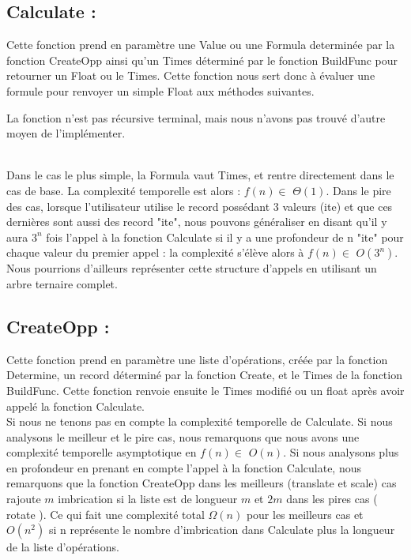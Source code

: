 \subsection{Calculate :}
Cette fonction prend en paramètre une Value ou une Formula determinée par la fonction CreateOpp ainsi qu'un Times déterminé par le fonction BuildFunc pour retourner un Float ou le Times. Cette fonction nous sert donc à évaluer une formule pour renvoyer un simple Float aux méthodes suivantes.

La fonction n'est pas récursive terminal, mais nous n'avons pas trouvé d'autre moyen de l'implémenter.

\\Dans le cas le plus simple, la Formula vaut Times, et rentre directement dans le cas de base.
La complexité temporelle est alors : $f(n) \in$  $\Theta(1)$. Dans le pire des cas, lorsque l'utilisateur utilise le record possédant 3 valeurs (ite) et que ces dernières sont aussi des record "ite", nous pouvons généraliser en disant qu'il y aura $3^n$ fois l'appel à la fonction Calculate si il y a une profondeur de n "ite" pour chaque valeur du premier appel : la complexité s'élève alors à $f(n) \in$  $O(3^n)$. Nous pourrions d'ailleurs représenter cette structure d'appels en utilisant un arbre ternaire complet.

\subsection{CreateOpp :}
Cette fonction prend en paramètre une liste d'opérations, créée par la fonction Determine, un record déterminé par la fonction Create, et le Times de la fonction BuildFunc. Cette fonction renvoie ensuite le Times modifié ou un float après avoir appelé la fonction Calculate.
\\Si nous ne tenons pas en compte la complexité temporelle de Calculate. Si nous analysons le meilleur et le pire cas, nous remarquons que nous avons une complexité temporelle asymptotique en $f(n) \in$ $O(n)$. Si nous analysons plus en profondeur en prenant en compte l'appel à la fonction Calculate, nous remarquons que la fonction CreateOpp dans les meilleurs (translate et scale) cas rajoute $m$ imbrication si la liste est de longueur $m$ et $2m$ dans les pires cas ( rotate ). Ce qui fait une complexité total $\Omega(n)$ pour les meilleurs cas et $O(n^2)$ si n représente le nombre d'imbrication dans Calculate plus la longueur de la liste d'opérations.
